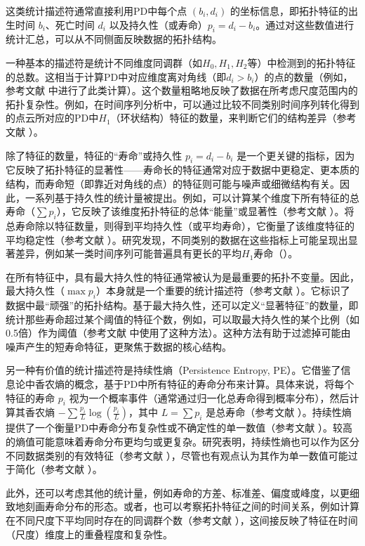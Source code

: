             这类统计描述符通常直接利用PD中每个点 $(b_i, d_i)$ 的坐标信息，即拓扑特征的出生时间 $b_i$、死亡时间 $d_i$ 以及持久性（或寿命）$p_i = d_i - b_i$。通过对这些数值进行统计汇总，可以从不同侧面反映数据的拓扑结构。
            
            一种基本的描述符是统计不同维度同调群（如$H_0, H_1, H_2$等）中检测到的拓扑特征的总数。这相当于计算PD中对应维度离对角线（即$d_i > b_i$）的点的数量（例如，参考文献  中进行了此类计算）。这个数量粗略地反映了数据在所考虑尺度范围内的拓扑复杂性。例如，在时间序列分析中，可以通过比较不同类别时间序列转化得到的点云所对应的PD中$H_1$（环状结构）特征的数量，来判断它们的结构差异（参考文献 ）。
            
            除了特征的数量，特征的“寿命”或持久性 $p_i = d_i - b_i$ 是一个更关键的指标，因为它反映了拓扑特征的显著性——寿命长的特征通常对应于数据中更稳定、更本质的结构，而寿命短（即靠近对角线的点）的特征则可能与噪声或细微结构有关。因此，一系列基于持久性的统计量被提出。例如，可以计算某个维度下所有特征的总寿命（$\sum p_i$），它反映了该维度拓扑特征的总体“能量”或显著性（参考文献 ）。将总寿命除以特征数量，则得到平均持久性（或平均寿命），它衡量了该维度特征的平均稳定性（参考文献 ）。研究发现，不同类别的数据在这些指标上可能呈现出显著差异，例如某一类时间序列可能普遍具有更长的平均$H_1$寿命（）。
            
            在所有特征中，具有最大持久性的特征通常被认为是最重要的拓扑不变量。因此，最大持久性（$\max p_i$）本身就是一个重要的统计描述符（参考文献 ）。它标识了数据中最“顽强”的拓扑结构。基于最大持久性，还可以定义“显著特征”的数量，即统计那些寿命超过某个阈值的特征个数，例如，可以取最大持久性的某个比例（如0.5倍）作为阈值（参考文献  中使用了这种方法）。这种方法有助于过滤掉可能由噪声产生的短寿命特征，更聚焦于数据的核心结构。
            
            另一种有价值的统计描述符是持续性熵（Persistence Entropy, PE）。它借鉴了信息论中香农熵的概念，基于PD中所有特征的寿命分布来计算。具体来说，将每个特征的寿命 $p_i$ 视为一个概率事件（通常通过归一化总寿命得到概率分布），然后计算其香农熵 $-\sum \frac{p_i}{L} \log(\frac{p_i}{L})$，其中 $L = \sum p_i$ 是总寿命（参考文献 ）。持续性熵提供了一个衡量PD中寿命分布复杂性或不确定性的单一数值（参考文献 ）。较高的熵值可能意味着寿命分布更均匀或更复杂。研究表明，持续性熵也可以作为区分不同数据类别的有效特征（参考文献 ），尽管也有观点认为其作为单一数值可能过于简化（参考文献 ）。
            
            此外，还可以考虑其他的统计量，例如寿命的方差、标准差、偏度或峰度，以更细致地刻画寿命分布的形态。或者，也可以考察拓扑特征之间的时间关系，例如计算在不同尺度下平均同时存在的同调群个数（参考文献 ），这间接反映了特征在时间（尺度）维度上的重叠程度和复杂性。
            
